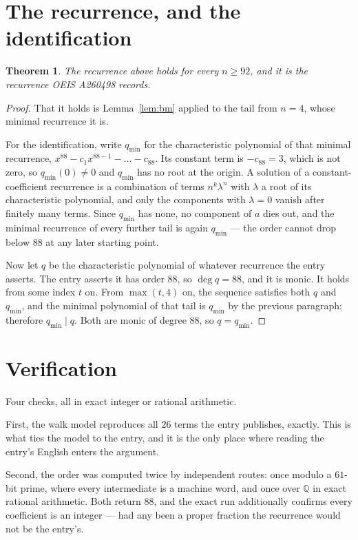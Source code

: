 \documentclass[11pt,a4paper]{article}
\theoremstyle{plain}
\newtheorem{theorem}{Theorem}
\theoremstyle{definition}
\begin{document}
\section{The recurrence, and the identification}

\begin{theorem}
The recurrence above holds for every $n\ge92$, and it is the recurrence OEIS A260498 records.
\end{theorem}

\begin{proof}
That it holds is Lemma~\ref{lem:bm} applied to the tail from $n=4$, whose minimal
recurrence it is.

For the identification, write $q_{\min}$ for the characteristic polynomial of that minimal
recurrence, $x^{88}-c_1x^{88-1}-\dots-c_{88}$. Its constant term is
$-c_{88}=3$, which is not zero, so $q_{\min}(0)\neq0$ and $q_{\min}$ has no
root at the origin. A solution of a constant-coefficient recurrence is a combination of terms
$n^{k}\lambda^{n}$ with $\lambda$ a root of its characteristic polynomial, and only the
components with $\lambda=0$ vanish after finitely many terms. Since $q_{\min}$ has none, no
component of $a$ dies out, and the minimal recurrence of every further tail is again
$q_{\min}$ --- the order cannot drop below $88$ at any later starting point.

Now let $q$ be the characteristic polynomial of whatever recurrence the entry asserts. The
entry asserts it has order $88$, so $\deg q=88$, and it is monic. It holds from some
index $t$ on. From $\max(t,4)$ on, the sequence satisfies both $q$ and $q_{\min}$, and
the minimal polynomial of that tail is $q_{\min}$ by the previous paragraph; therefore
$q_{\min}\mid q$. Both are monic of degree $88$, so $q=q_{\min}$.
\end{proof}

\section{Verification}

Four checks, all in exact integer or rational arithmetic.

First, the walk model reproduces all $26$ terms the entry publishes, exactly. This is
what ties the model to the entry, and it is the only place where reading the entry's English
enters the argument.

Second, the order was computed twice by independent routes: once modulo a $61$-bit prime, where
every intermediate is a machine word, and once over $\mathbb{Q}$ in exact rational arithmetic.
Both return $88$, and the exact run additionally confirms every coefficient is an integer
--- had any been a proper fraction the recurrence would not be the entry's.
\end{document}
